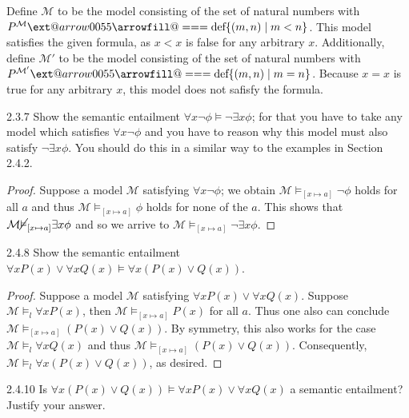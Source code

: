 \documentclass{exam}
\makeatletter
\def\@xequals@fill{\arrowfill@\Relbar\Relbar\Relbar}
\newcommand*\xequals[2][]{\DOTSB\ext@arrow0055\@xequals@fill{#1}{#2}}
\makeatother
\begin{document}
Define $\mathcal M$ to be the model consisting of the set of natural numbers with $P^{\mathcal M} \xequals{\text{def}} \{(m, n) \mid m < n\}$. This model satisfies the given formula, as $x < x$ is false for any arbitrary $x$. Additionally, define $\mathcal M'$ to be the model consisting of the set of natural numbers with $P^{\mathcal M'} \xequals{\text{def}} \{(m, n) \mid m = n\}$. Because $x = x$ is true for any arbitrary $x$, this model does not safisfy the formula.

\begin{problem}{2.3.7}
	Show the semantic entailment $\forall x \lnot \phi \vDash \lnot\exists x \phi$; for that you have to take any model which satisfies $\forall x \lnot \phi$ and you have to reason why this model must also satisfy $\lnot \exists x \phi$. You should do this in a similar way to the examples in Section 2.4.2.
\end{problem}
\begin{proof}
	Suppose a model $\mathcal M$ satisfying $\forall x \lnot \phi$; we obtain $\mathcal M \vDash_{[x \mapsto a]} \lnot \phi$ holds for all $a$ and thus $\mathcal M \vDash_{[x \mapsto a]} \phi$ holds for none of the $a$. This shows that $\mathcal M \cancel{\vDash}_{[x \mapsto a]} \exists x \phi$ and so we arrive to $\mathcal M \vDash_{[x \mapsto a]} \lnot \exists x \phi$.
\end{proof}

\begin{problem}{2.4.8}
	Show the semantic entailment $\forall x P(x) \lor \forall x Q(x) \vDash \forall x (P(x) \lor Q(x))$.
\end{problem}

\begin{proof}
	Suppose a model $\mathcal M$ satisfying $\forall x P(x) \lor \forall x Q(x)$. Suppose $\mathcal M \vDash_l \forall x P(x)$, then $\mathcal M \vDash_{[x \mapsto a]} P(x)$ for all $a$. Thus one also can conclude $\mathcal M \vDash_{[x \mapsto a]} (P(x) \lor Q(x))$. By symmetry, this also works for the case $\mathcal M \vDash_l \forall x Q(x)$ and thus $\mathcal M \vDash_{[x \mapsto a]} (P(x) \lor Q(x))$. Consequently, $\mathcal M \vDash_l \forall x (P(x) \lor Q(x))$, as desired.
\end{proof}

\begin{problem}{2.4.10}
	Is $\forall x (P(x) \lor Q(x)) \vDash \forall x P(x) \lor \forall x Q(x)$ a semantic entailment? Justify your answer.
\end{problem}
\end{document}
